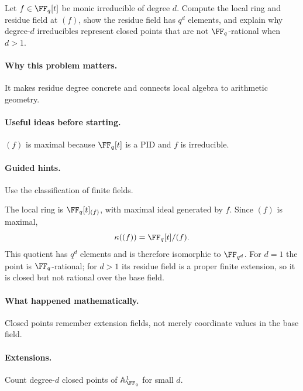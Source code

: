 \begin{problem}
Let $f\in\FF_q[t]$ be monic irreducible of degree $d$.  Compute the local ring and residue field at $(f)$, show the residue field has $q^d$ elements, and explain why degree-$d$ irreducibles represent closed points that are not $\FF_q$-rational when $d>1$.
\end{problem}

\paragraph{Why this problem matters.}
It makes residue degree concrete and connects local algebra to arithmetic geometry.

\paragraph{Useful ideas before starting.}
$(f)$ is maximal because $\FF_q[t]$ is a PID and $f$ is irreducible.

\paragraph{Guided hints.}
Use the classification of finite fields.

\begin{solution}
The local ring is $\FF_q[t]_{(f)}$, with maximal ideal generated by $f$.  Since $(f)$ is maximal,
\[
\kappa((f))=\FF_q[t]/(f).
\]
This quotient has $q^d$ elements and is therefore isomorphic to $\FF_{q^d}$.  For $d=1$ the point is $\FF_q$-rational; for $d>1$ its residue field is a proper finite extension, so it is closed but not rational over the base field.
\end{solution}

\paragraph{What happened mathematically.}
Closed points remember extension fields, not merely coordinate values in the base field.

\paragraph{Extensions.}
Count degree-$d$ closed points of $\mathbb A^1_{\FF_q}$ for small $d$.
